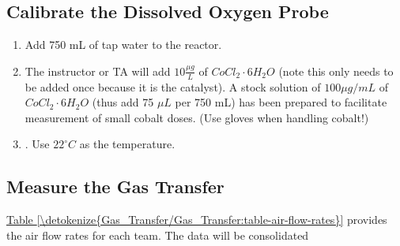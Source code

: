 \documentclass[letterpaper,10pt,english]{sphinxmanual}
\begin{document}
\subsection{Calibrate the Dissolved Oxygen Probe}
\label{\detokenize{Gas_Transfer/Gas_Transfer:calibrate-the-dissolved-oxygen-probe}}\begin{enumerate}
\item {} 
Add 750 mL of tap water to the reactor.

\item {} 
The instructor or TA will add \(10\frac{ \mu g}{L}\) of \(CoCl_2 \cdot 6H_2O\) (note this only needs to be added once because it is the catalyst). A stock solution of \(100 \mu g/mL\) of \(CoCl_2 \cdot 6H_2O\) (thus add 75 \(\mu L\) per 750 mL) has been prepared to facilitate measurement of small cobalt doses. (Use gloves when handling cobalt!)

\item {} 
{\hyperref[\detokenize{ProCoDA/ProCoDA:heading-procoda-dissolved-oxygen}]{}}. Use \(22^{\circ}C\) as the temperature.

\end{enumerate}


\subsection{Measure the Gas Transfer}
\label{\detokenize{Gas_Transfer/Gas_Transfer:measure-the-gas-transfer}}
\hyperref[\detokenize{Gas_Transfer/Gas_Transfer:table-air-flow-rates}]{Table \ref{\detokenize{Gas_Transfer/Gas_Transfer:table-air-flow-rates}}} provides the air flow rates for each team. The data will be consolidated
\end{document}
